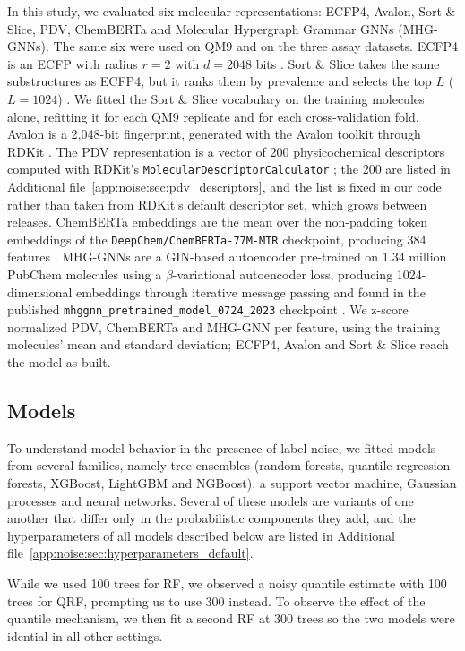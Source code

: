 In this study, we evaluated six molecular representations: ECFP4, Avalon, Sort \& Slice, PDV, ChemBERTa and Molecular Hypergraph Grammar GNNs (MHG-GNNs). The same six were used on QM9 and on the three assay datasets. ECFP4 is an ECFP with radius $r = 2$ with $d = 2048$ bits \citep{rogers2010, rdkit}. Sort \& Slice takes the same substructures as ECFP4, but it ranks them by prevalence and selects the top $L$ ($L=1024$) \citep{sns}. We fitted the Sort \& Slice vocabulary on the training molecules alone, refitting it for each QM9 replicate and for each cross-validation fold.  Avalon is a 2,048-bit fingerprint, generated with the Avalon toolkit through RDKit \citep{avalon, rdkit}. The PDV representation is a vector of 200 physicochemical descriptors computed with RDKit's \texttt{MolecularDescriptorCalculator} \citep{rdkit, Cherkasov2014}; the 200 are listed in Additional file~\ref{app:noise:sec:pdv_descriptors}, and the list is fixed in our code rather than taken from RDKit's default descriptor set, which grows between releases. ChemBERTa embeddings are the mean over the non-padding token embeddings of the \texttt{DeepChem/ChemBERTa-77M-MTR} checkpoint, producing 384 features \citep{Ahmad2022}. MHG-GNNs are a GIN-based autoencoder pre-trained on 1.34 million PubChem molecules using a $\beta$-variational autoencoder loss, producing 1024-dimensional embeddings through iterative message passing and found in the published \texttt{mhggnn\_pretrained\_model\_0724\_2023} checkpoint \citep{kishimoto2023}. We z-score normalized PDV, ChemBERTa and MHG-GNN per feature, using the training molecules' mean and standard deviation; ECFP4, Avalon and Sort \& Slice reach the model as built.

\subsection{Models}

To understand model behavior in the presence of label noise, we fitted models from several families, namely tree ensembles (random forests, quantile regression forests, XGBoost, LightGBM and NGBoost), a support vector machine, Gaussian processes and neural networks. Several of these models are variants of one another that differ only in the probabilistic components they add, and the hyperparameters of all models described below are listed in Additional file~\ref{app:noise:sec:hyperparameters_default}.

While we used 100 trees for RF, we observed a noisy quantile estimate with 100 trees for QRF, prompting us to use 300 instead. To observe the effect of the quantile mechanism, we then fit a second RF at 300 trees so the two models were idential in all other settings.


